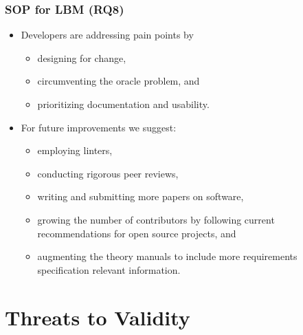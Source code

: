 \documentclass[usenames,dvipsnames]{beamer}
\begin{document}

\begin{frame}

  \frametitle{SOP for LBM (RQ8)}

  \begin{itemize}
    \item Developers are addressing pain points by
    \begin{itemize}
      \item designing for change, 
      \item circumventing the oracle problem, and 
      \item prioritizing documentation and usability.
    \end{itemize}  
    \item For future improvements we suggest:
    \begin{itemize}
      \item employing linters, 
      \item conducting rigorous peer reviews, 
      \item writing and submitting more papers on software, 
      \item growing the number of contributors by following current
      recommendations for open source projects, and 
      \item augmenting the theory manuals to include more requirements
      specification relevant information.
    \end{itemize} 
  \end{itemize}

\end{frame}
  

\section[Threats]{Threats to Validity}

\end{document}
